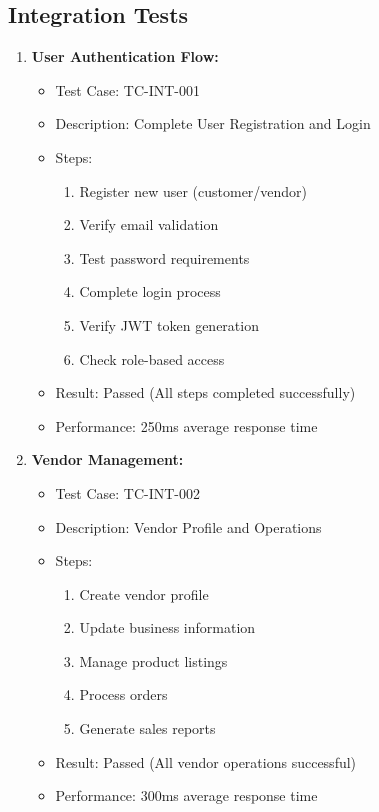 \subsection{Integration Tests}
\begin{enumerate}
    \item \textbf{User Authentication Flow:}
    \begin{itemize}
        \item Test Case: TC-INT-001
        \item Description: Complete User Registration and Login
        \item Steps:
        \begin{enumerate}
            \item Register new user (customer/vendor)
            \item Verify email validation
            \item Test password requirements
            \item Complete login process
            \item Verify JWT token generation
            \item Check role-based access
        \end{enumerate}
        \item Result: Passed (All steps completed successfully)
        \item Performance: 250ms average response time
    \end{itemize}

    \item \textbf{Vendor Management:}
    \begin{itemize}
        \item Test Case: TC-INT-002
        \item Description: Vendor Profile and Operations
        \item Steps:
        \begin{enumerate}
            \item Create vendor profile
            \item Update business information
            \item Manage product listings
            \item Process orders
            \item Generate sales reports
        \end{enumerate}
        \item Result: Passed (All vendor operations successful)
        \item Performance: 300ms average response time
    \end{itemize}


\end{enumerate}
